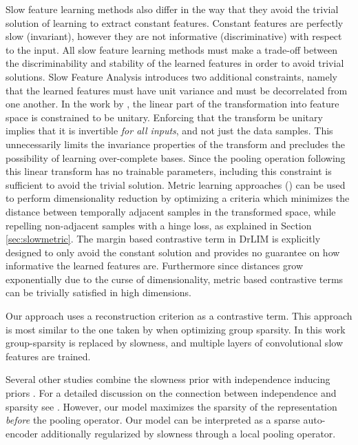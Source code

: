 Slow feature learning methods also differ in the way that they avoid the
trivial solution of learning to extract constant features. Constant features
are perfectly slow (invariant), however they are not informative
(discriminative) with respect to the input. All slow feature learning methods
must make a trade-off between the discriminability and stability of the learned
features in order to avoid trivial solutions. Slow Feature Analysis introduces
two additional constraints, namely that the learned features must have unit
variance and must be decorrelated from one another. In the work by
\cite{complexCells}, the linear part of the transformation into feature space
is constrained to be unitary. Enforcing that the transform be unitary implies
that it is invertible \emph{for all inputs}, and not just the data samples.
This unnecessarily limits the invariance properties of the transform and
precludes the possibility of learning over-complete bases. Since the pooling
operation following this linear transform has no trainable parameters,
including this constraint is sufficient to avoid the trivial solution. Metric
learning approaches (\cite{DrLIM}) can be used to perform dimensionality
reduction by optimizing a criteria which minimizes the distance between
temporally adjacent samples in the transformed space, while repelling
non-adjacent samples with a hinge loss, as explained in Section
\ref{sec:slowmetric}. The margin based contrastive term in DrLIM is explicitly
designed to only avoid the constant solution and provides no guarantee on how
informative the learned features are. Furthermore since distances grow
exponentially due to the curse of dimensionality, metric based contrastive
terms can be trivially satisfied in high dimensions.

Our approach uses a reconstruction criterion as a contrastive term. This
approach is most similar to the one taken by \cite{groupSparsity} when
optimizing group sparsity. In this work group-sparsity is replaced by slowness,
and multiple layers of convolutional slow features are trained. 

Several other studies combine the slowness prior with independence inducing
priors \cite{complexCells, Cadieu, zou2012deep}. For a detailed discussion on
the connection between independence and sparsity see \cite{Huyvarinen}.
However, our model maximizes the sparsity of the representation \emph{before}
the pooling operator. Our model can be interpreted as a sparse auto-encoder
additionally regularized by slowness through a local pooling operator.   

